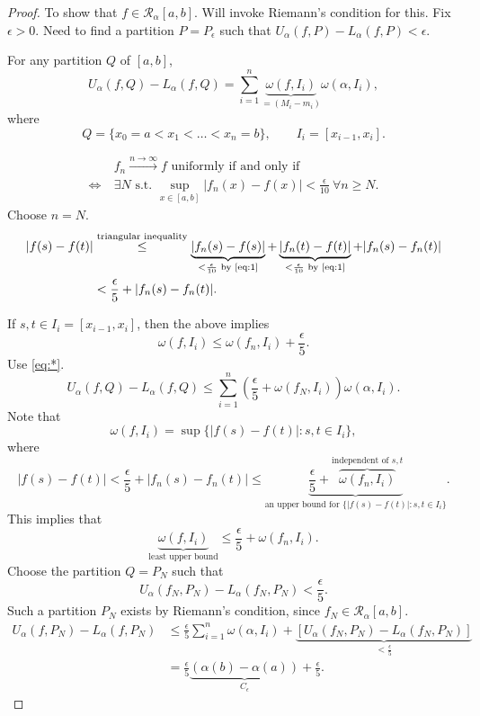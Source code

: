 \documentclass[letterpaper, reqno,11pt]{article}
\begin{document}
\begin{proof}
   To show that $f \in \mathcal R_\alpha[a, b]$. Will invoke Riemann's condition for this. Fix $\epsilon > 0$. Need to find a partition $P = P_\epsilon$ such that $U_\alpha(f, P) - L_\alpha(f, P) < \epsilon$.

  For any partition $Q$ of $[a, b]$,
  $$ U_\alpha(f, Q) - L_\alpha(f, Q) = \sum_{i = 1}^n \underbrace{\omega(f, I_i)}_{= (M_i - m_i)} \omega(\alpha, I_i), $$
  where
  $$ Q = \{ x_0 = a < x_1 < \ldots < x_n = b \}, \qquad I_i = [x_{i - 1}, x_i]. $$

  \begin{align}
    & \text{$f_n \xrightarrow{n \to \infty} f$ uniformly if and only if} \nonumber \\
    \Leftrightarrow ~ & \exists N \text{ s.t. } \sup_{x \in [a, b]} |f_n(x) - f(x)| < \frac{\epsilon}{10} ~ \forall n \geq N. \label{eq:1}
  \end{align}
  Choose $n = N$.
  \begin{align*}
    |f(s) - f(t)| &\overset{\text{triangular inequality}}{\leq} \underbrace{|f_n(s) - f(s)|}_{< \frac{\epsilon}{10} \text{ by \eqref{eq:1}}} + \underbrace{|f_n(t) - f(t)|}_{< \frac{\epsilon}{10} \text{ by \eqref{eq:1}}} + |f_n(s) - f_n(t)| \\
    &< \frac{\epsilon}{5} + |f_n(s) - f_n(t)|.
  \end{align*}

  If $s, t \in I_i = [x_{i - 1}, x_i]$, then the above implies
  \begin{equation} \label{eq:*} \tag{*}
    \omega(f, I_i) \leq \omega(f_n, I_i) + \frac{\epsilon}{5}.
  \end{equation}
  Use \eqref{eq:*}.
  \begin{equation} \label{eq:**} \tag{**}
    U_\alpha(f, Q) - L_\alpha(f, Q) \leq \sum_{i = 1}^n \left(\frac{\epsilon}{5} + \omega(f_N, I_i)\right) \omega(\alpha, I_i).
  \end{equation}
  Note that
  $$ \omega(f, I_i) = \sup\{ |f(s) - f(t)| : s, t \in I_i \}, $$
  where
  $$ |f(s) - f(t)| < \frac{\epsilon}{5} + |f_n(s) - f_n(t)| \leq \underbrace{\frac{\epsilon}{5} + \overbrace{\omega(f_n, I_i)}^\text{independent of $s, t$}}_\text{an upper bound for $\{ |f(s) - f(t)| : s, t \in I_i \}$}. $$
  This implies that
  $$ \underbrace{\omega(f, I_i)}_\text{least upper bound} \leq \frac{\epsilon}{5} + \omega(f_n, I_i). $$
  Choose the partition $Q = P_N$ such that
  $$ U_\alpha(f_N, P_N) - L_\alpha(f_N, P_N) < \frac{\epsilon}{5}. $$
  Such a partition $P_N$ exists by Riemann's condition, since $f_N \in \mathcal R_\alpha[a, b]$.
  \begin{align*}
    U_\alpha(f, P_N) - L_\alpha(f, P_N) &\leq \frac{\epsilon}{5} \sum_{i = 1}^n \omega(\alpha, I_i) + \underbrace{[U_\alpha(f_N, P_N) - L_\alpha(f_N, P_N)]}_{< \frac{\epsilon}{5}} \\
    &= \frac{\epsilon}{5} \underbrace{(\alpha(b) - \alpha(a))}_{C_\epsilon} + \frac{\epsilon}{5}.
  \end{align*}


\end{proof}
\end{document}
